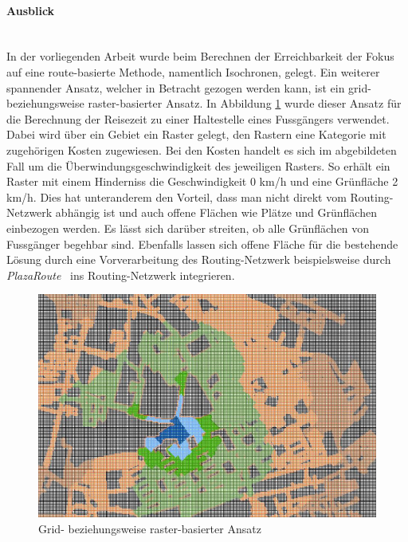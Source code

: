 \paragraph{Ausblick}~\\
In der vorliegenden Arbeit wurde beim Berechnen der Erreichbarkeit der Fokus auf eine route-basierte Methode, namentlich Isochronen, gelegt.
Ein weiterer spannender Ansatz, welcher in Betracht gezogen werden kann, ist ein grid- beziehungsweise raster-basierter Ansatz.
In Abbildung \ref{fig:grid_based_approach} wurde dieser Ansatz für die Berechnung der Reisezeit zu einer Haltestelle eines Fussgängers verwendet.
Dabei wird über ein Gebiet ein Raster gelegt, den Rastern eine Kategorie mit zugehörigen Kosten zugewiesen.
Bei den Kosten handelt es sich im abgebildeten Fall um die Überwindungsgeschwindigkeit des jeweiligen Rasters.
So erhält ein Raster mit einem Hinderniss die Geschwindigkeit 0 km/h und eine Grünfläche 2 km/h.
Dies hat unteranderem den Vorteil, dass man nicht direkt vom Routing-Netzwerk abhängig ist und auch offene Flächen wie Plätze und Grünflächen einbezogen werden.
Es lässt sich darüber streiten, ob alle Grünflächen von Fussgänger begehbar sind.
Ebenfalls lassen sich offene Fläche für die bestehende Lösung durch eine Vorverarbeitung des Routing-Netzwerk beispielsweise durch \emph{PlazaRoute}~\cite{plaza_route} ins Routing-Netzwerk integrieren.

\begin{figure}[ht]
    \centering
    \includegraphics[width=0.8\linewidth]{start/img/grid_based_approach.png}
    \caption[Grid- beziehungsweise raster-basierter Ansatz]{Grid- beziehungsweise raster-basierter Ansatz~\cite{pedestrian_accessibility_planning}}
    \label{fig:grid_based_approach}
\end{figure}
